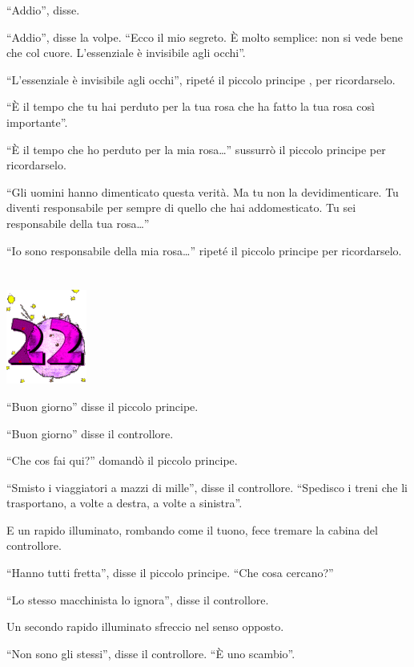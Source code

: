 \documentclass[11pt]{scrbook}
\begin{document}
``Addio'', disse.

``Addio'', disse la volpe. ``Ecco il mio segreto. È molto semplice: non si vede bene che col cuore. L'essenziale è invisibile agli occhi''.

``L'essenziale è invisibile agli occhi'', ripeté il piccolo principe , per ricordarselo.

``È il tempo che tu hai perduto per la tua rosa che ha fatto la tua rosa così importante''.

``È il tempo che ho perduto per la mia rosa\ldots{}'' sussurrò il piccolo principe per ricordarselo.

``Gli uomini hanno dimenticato questa verità. Ma tu non la devidimenticare. Tu diventi responsabile per sempre di quello che hai addomesticato. Tu sei responsabile della tua rosa\ldots{}''

``Io sono responsabile della mia rosa\ldots{}'' ripeté il piccolo principe per ricordarselo.

\chapter{}
\begin{center}
\includegraphics{img/chapter22}
\end{center}

``Buon giorno'' disse il piccolo principe.

``Buon giorno'' disse il controllore.

``Che cos fai qui?'' domandò il piccolo principe.

``Smisto i viaggiatori a mazzi di mille'', disse il controllore. ``Spedisco i treni che li trasportano, a volte a destra, a volte a sinistra''.

E un rapido illuminato, rombando come il tuono, fece tremare la cabina del controllore.

``Hanno tutti fretta'', disse il piccolo principe. ``Che cosa cercano?''

``Lo stesso macchinista lo ignora'', disse il controllore.

Un secondo rapido illuminato sfreccio nel senso opposto.

``Non sono gli stessi'', disse il controllore. ``È uno scambio''.
\end{document}
